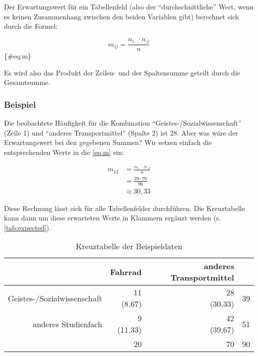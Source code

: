 \documentclass[
  ngerman,
]{article}
\begin{document}
Der Erwartungswert für ein Tabellenfeld (also der ``durchschnittliche'' Wert, wenn es keinen Zusammenhang zwischen den beiden Variablen gibt) berechnet sich durch die Formel:

\nopagebreak

\[
m_{ij}=\frac{n_{i\cdot}\cdot n_{\cdot j}}{n}
\]\{\#eq:m\}

Es wird also das Produkt der Zeilen- und der Spaltensumme geteilt durch die Gesamtsumme.

\hypertarget{beispiel-31}{%
\subsubsection{Beispiel}\label{beispiel-31}}

Die beobachtete Häufigkeit für die Kombination ``Geistes-/Sozialwissenschaft'' (Zeile 1) und ``anderes Transportmittel'' (Spalte 2) ist 28. Aber was wäre der Erwartungswert bei den gegebenen Summen? Wir setzen einfach die entsprechenden Werte in die \autoref{eq:m} ein:

\nopagebreak

\[\begin{aligned}
m_{12}&=\frac{n_{1\cdot}\cdot n_{\cdot 2}}{n}\\[5pt]
&=\frac{39\cdot 70}{90}\\[4pt]
&\approx 30,33
\end{aligned}\]

Diese Rechnung lässt sich für alle Tabellenfelder durchführen. Die Kreuztabelle kann dann um diese erwarteten Werte in Klammern ergänzt werden (s. \autoref{tab:expected}).

\begin{table}

\caption{\label{tab:expected}Kreuztabelle der Beispieldaten}
\centering
\begin{tabular}[t]{>{}r|r>{}r|r}
\toprule
 & Fahrrad & anderes Transportmittel & \\
\midrule
Geistes-/Sozialwissenschaft & \makecell[tr]{11\\(8,67)} & \makecell[tr]{28\\(30,33)} & 39\\
anderes Studienfach & \makecell[tr]{9\\(11,33)} & \makecell[tr]{42\\(39,67)} & 51\\
\midrule
 & 20 & 70 & 90\\
\bottomrule
\end{tabular}
\end{table}
\end{document}
